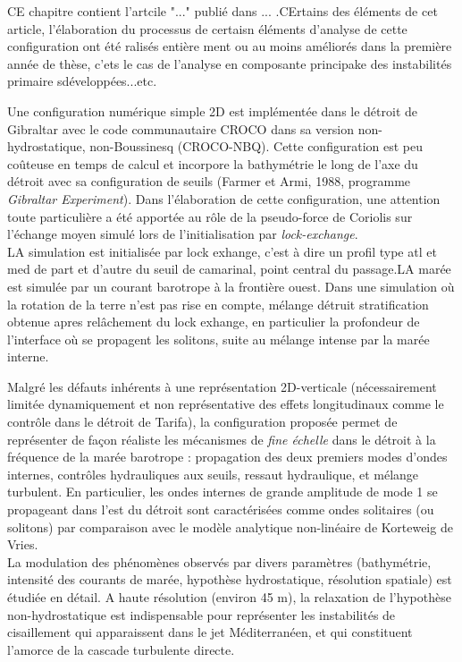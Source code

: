 \documentclass[a4paper,12pt,notitlepage]{report}
\numberwithin{equation}{section}
\begin{document}
CE chapitre contient l'artcile "..." publié dans ... .CErtains des éléments de cet article, l'élaboration du processus de 
certaisn éléments d'analyse de cette configuration ont été ralisés entière ment ou au moins améliorés dans la première année de thèse, c'ets le cas de l'analyse en composante principake des instabilités primaire sdéveloppées...etc.


Une configuration numérique simple 2D est implémentée dans le détroit de Gibraltar avec le code communautaire CROCO dans sa version non-hydrostatique, non-Boussinesq (CROCO-NBQ). Cette configuration est peu coûteuse en temps de calcul et incorpore la bathymétrie le long de l'axe du détroit avec sa configuration de seuils (Farmer et Armi, 1988, programme \textit{Gibraltar Experiment}). Dans l'élaboration de cette configuration, une attention toute particulière a été apportée au rôle de la pseudo-force de Coriolis sur l'échange moyen simulé lors de l'initialisation par \textit{lock-exchange}.\\

LA simulation est initialisée par lock exhange, c'est à dire un profil type atl et med de part et d'autre du seuil de camarinal, point central du passage.LA marée est simulée par un courant barotrope à la frontière ouest. Dans une simulation où la rotation de la terre n'est pas rise en compte, mélange détruit stratification obtenue apres relâchement du lock exhange, en particulier la profondeur de l'interface où se propagent les solitons, suite au mélange intense par la marée interne.


Malgré les défauts inhérents à une représentation 2D-verticale (nécessairement limitée dynamiquement et non représentative des effets longitudinaux comme le contrôle dans le détroit de Tarifa), la configuration proposée permet de représenter de façon réaliste les mécanismes de \textit{fine échelle} dans le détroit à la fréquence de la marée barotrope : propagation des deux premiers modes d'ondes internes, contrôles hydrauliques aux seuils, ressaut hydraulique, et mélange turbulent. En particulier, les ondes internes de grande amplitude de mode 1 se propageant dans l'est du détroit sont caractérisées comme ondes solitaires (ou solitons) par comparaison avec le modèle analytique non-linéaire de Korteweig de Vries.\\

La modulation des phénomènes observés par divers paramètres (bathymétrie, intensité des courants de marée, hypothèse hydrostatique, résolution spatiale) est étudiée en détail. A haute résolution (environ 45 m), la relaxation de l'hypothèse non-hydrostatique est indispensable pour représenter les instabilités de cisaillement qui apparaissent dans le jet Méditerranéen, et qui constituent l'amorce de la cascade turbulente directe.
\end{document}
